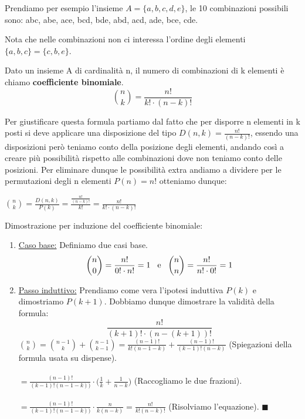 \begin{example}
Prendiamo per esempio l'insieme $A = \{a,b,c,d,e\}$, le 10 combinazioni possibili sono:
abc, abe, ace, bcd, bde, abd, acd, ade, bce, cde.
\end{example}

\begin{note}
Nota che nelle combinazioni non ci interessa l'ordine degli elementi $\{a,b,c\} = \{c,b,e\}$.
\end{note}

\begin{definition}
Dato un insieme A di cardinalità n, il numero di combinazioni di k elementi è chiamo \textbf{coefficiente binomiale}.
\begin{equation}
    \binom{n}{k} = \frac{\displaystyle n!}{\displaystyle k! \cdot (n - k)!}
\end{equation}
\end{definition}

\hspace{-15pt}Per giustificare questa formula partiamo dal fatto che per disporre n elementi in k posti si deve applicare una disposizione del tipo $D(n,k) = \frac{n!}{(n - k)!}$, essendo una disposizioni però teniamo conto della posizione degli elementi, andando così a creare più possibilità rispetto alle combinazioni dove non teniamo conto delle posizioni. Per eliminare dunque le possibilità extra andiamo a dividere per le permutazioni degli n elementi $P(n) = n!$ otteniamo dunque:
\begin{center}
    $\binom{n}{k} = \frac{D(n,k)}{P(k)} = \frac{\frac{n!}{(n-k)!}}{k!} = \frac{n!}{k! \cdot (n - k)!}$
\end{center}

\begin{demostration}
    Dimostrazione per induzione del coefficiente binomiale:
    \begin{enumerate}
        \item \underline{Caso base:} Definiamo due casi base.
        \[\binom{n}{0} = \frac{n!}{0! \cdot n!} = 1 \hspace{.3cm}\text{e}\hspace{.3cm} \binom{n}{n} = \frac{n!}{n! \cdot 0!} = 1\]
        \item \underline{Passo induttivo:} Prendiamo come vera l'ipotesi induttiva $P(k)$ e dimostriamo $P(k + 1)$. Dobbiamo dunque dimostrare la validità della formula: \[\frac{n!}{(k+1)! \cdot (n - (k+1))!}\]
        $\binom{n}{k} = \binom{n - 1}{k} + \binom{n - 1}{k - 1} = \frac{(n-1)!}{k! (n - 1 - k)} + \frac{(n-1)!}{(k - 1)! (n - k)}$ (Spiegazioni della formula usata su dispense).\\\\
        $= \frac{(n-1)!}{(k-1)!(n-1-k))} \cdot \bigl(\frac{1}{k} + \frac{1}{n-k} \bigr)$ (Raccogliamo le due frazioni).\\\\
        $= \frac{(n-1)!}{(k-1)!(n-1-k))} \cdot \frac{n}{k(n-k)} = \frac{n!}{k!(n-k)!}$ (Risolviamo l'equazione). $\blacksquare$
    \end{enumerate}
\end{demostration}

